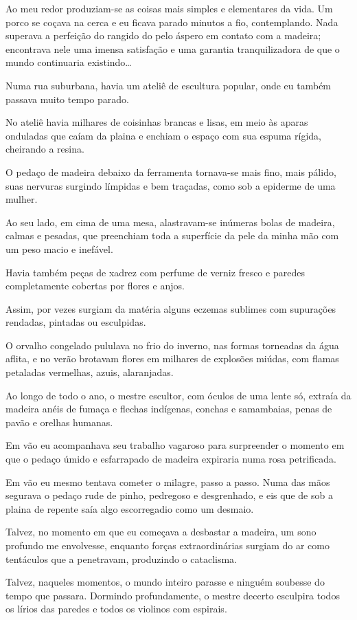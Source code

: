 Ao meu redor produziam-se as coisas mais simples e elementares da vida. Um porco se coçava na cerca e eu ficava parado minutos a fio, contemplando. Nada superava a perfeição do rangido do pelo áspero em contato com a madeira; encontrava nele uma imensa satisfação e uma garantia tranquilizadora de que o mundo continuaria existindo\dots

Numa rua suburbana, havia um ateliê de escultura popular, onde eu também passava muito tempo parado.

No ateliê havia milhares de coisinhas brancas e lisas, em meio às aparas onduladas que caíam da plaina e enchiam o espaço com sua espuma rígida, cheirando a resina.

O pedaço de madeira debaixo da ferramenta tornava-se mais fino, mais pálido, suas nervuras surgindo límpidas e bem traçadas, como sob a epiderme de uma mulher. 

Ao seu lado, em cima de uma mesa, alastravam-se inúmeras bolas de madeira, calmas e pesadas, que preenchiam toda a superfície da pele da minha mão com um peso macio e inefável.

Havia também peças de xadrez com perfume de verniz fresco e paredes completamente cobertas por flores e anjos.

Assim, por vezes surgiam da matéria alguns eczemas sublimes com supurações rendadas, pintadas ou esculpidas.

O orvalho congelado pululava no frio do inverno, nas formas torneadas da água aflita, e no verão brotavam flores em milhares de explosões miúdas, com flamas petaladas vermelhas, azuis, alaranjadas. 

Ao longo de todo o ano, o mestre escultor, com óculos de uma lente só, extraía da madeira anéis de fumaça e flechas indígenas, conchas e samambaias, penas de pavão e orelhas humanas.

Em vão eu acompanhava seu trabalho vagaroso para surpreender o momento em que o pedaço úmido e esfarrapado de madeira expiraria numa rosa petrificada.

Em vão eu mesmo tentava cometer o milagre, passo a passo. Numa das mãos segurava o pedaço rude de pinho, pedregoso e desgrenhado, e eis que de sob a plaina de repente saía algo escorregadio como um desmaio.

Talvez, no momento em que eu começava a desbastar a madeira, um sono profundo me envolvesse, enquanto forças extraordinárias surgiam do ar como tentáculos que a penetravam, produzindo o cataclisma. 

Talvez, naqueles momentos, o mundo inteiro parasse e ninguém soubesse do tempo que passara. Dormindo profundamente, o mestre decerto esculpira todos os lírios das paredes e todos os violinos com espirais.

